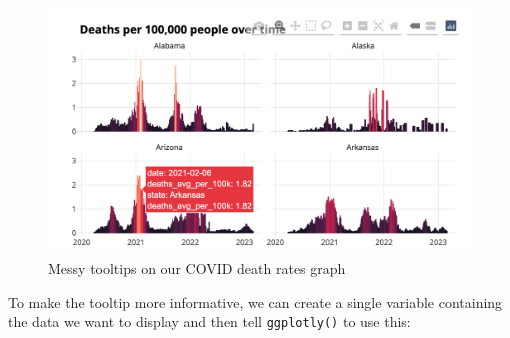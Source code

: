 \documentclass[
]{book}
\begin{document}
\begin{figure}
\includegraphics[width=1\linewidth]{assets/covid-website-messy-tooltips} \caption{Messy tooltips on our COVID death rates graph}\label{fig:covid-website-messy-tooltips}
\end{figure}

To make the tooltip more informative, we can create a single variable containing the data we want to display and then tell \texttt{ggplotly()} to use this:
\end{document}
